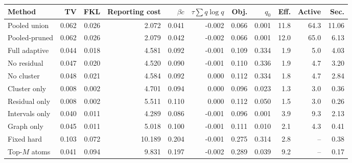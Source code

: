 \begin{tabular}{lrrrrrrrrrr}
\toprule
Method & TV & FKL & Reporting cost & $\beta c$ & $\tau\sum q\log q$ & Obj. & $q_0$ & Eff. & Active & Sec. \\
\midrule
Pooled union & 0.062 & 0.026 & 2.072 & 0.041 & -0.002 & 0.066 & 0.001 & 11.8 & 64.3 & 11.06 \\
Pooled-pruned & 0.062 & 0.026 & 2.079 & 0.042 & -0.002 & 0.066 & 0.001 & 12.0 & 65.0 & 6.13 \\
Full adaptive & 0.044 & 0.018 & 4.581 & 0.092 & -0.001 & 0.109 & 0.334 & 1.9 & 5.0 & 4.03 \\
No residual & 0.047 & 0.020 & 4.520 & 0.090 & -0.001 & 0.110 & 0.336 & 1.9 & 4.7 & 3.20 \\
No cluster & 0.048 & 0.021 & 4.584 & 0.092 & 0.000 & 0.112 & 0.334 & 1.8 & 4.7 & 2.84 \\
Cluster only & 0.008 & 0.002 & 4.701 & 0.094 & 0.000 & 0.096 & 0.023 & 1.3 & 3.0 & 0.36 \\
Residual only & 0.008 & 0.002 & 5.511 & 0.110 & 0.000 & 0.112 & 0.050 & 1.5 & 3.0 & 0.26 \\
Intervals only & 0.040 & 0.011 & 4.289 & 0.086 & -0.001 & 0.096 & 0.001 & 3.9 & 9.3 & 2.13 \\
Graph only & 0.045 & 0.011 & 5.018 & 0.100 & -0.001 & 0.111 & 0.010 & 2.1 & 4.3 & 0.41 \\
Fixed hard & 0.103 & 0.072 & 10.189 & 0.204 & -0.001 & 0.275 & 0.314 & 2.8 & -- & 0.38 \\
Top-$M$ atoms & 0.041 & 0.094 & 9.831 & 0.197 & -0.002 & 0.289 & 0.039 & 9.2 & -- & 0.17 \\
\bottomrule
\end{tabular}
